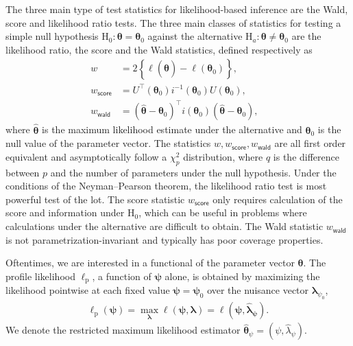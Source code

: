 \documentclass[]{book}
\begin{document}
The three main type of test statistics for likelihood-based inference are the Wald, score and likelihood ratio tests.
The three main classes of statistics for testing a simple null hypothesis \(\mathrm{H}_0: \boldsymbol{\theta}=\boldsymbol{\theta}_0\) against the alternative \(\mathrm{H}_a: \boldsymbol{\theta} \neq \boldsymbol{\theta}_0\) are the likelihood ratio, the score and the Wald statistics,
defined
respectively as
\begin{align*}
 w &= 2 \left\{ \ell(\hat{\boldsymbol{\theta}})-\ell(\boldsymbol{\theta}_0)\right\},\qquad 
 \\w_{\mathsf{score}} &= U^\top(\boldsymbol{\theta}_0)i^{-1}(\boldsymbol{\theta}_0)U(\boldsymbol{\theta}_0),\qquad
 \\ w_{\mathsf{wald}} &= (\hat{\boldsymbol{\theta}}-\boldsymbol{\theta}_0)^\top i(\boldsymbol{\theta}_0)(\hat{\boldsymbol{\theta}}-\boldsymbol{\theta}_0),
\end{align*}
where \(\hat{\boldsymbol{\theta}}\) is the maximum likelihood estimate under the alternative and
\(\boldsymbol{\theta}_0\) is the null value of the parameter vector. The statistics \(w, w_{\mathsf{score}}, w_{\mathsf{wald}}\) are all first order equivalent and asymptotically follow a \(\chi^2_p\) distribution, where \(q\) is the difference between \(p\) and the number of parameters under the null hypothesis. Under the conditions of the Neyman--Pearson theorem, the likelihood ratio test is most powerful test of the lot. The score statistic \(w_{\mathsf{score}}\) only requires
calculation of the score and information under
\(\mathrm{H}_0\), which can be useful in problems where calculations under the alternative are difficult to obtain. The Wald statistic \(w_{\mathsf{wald}}\) is not parametrization-invariant and typically has poor coverage properties.

Oftentimes, we are interested in a functional of the parameter vector \(\boldsymbol{\theta}\).
The profile
likelihood \(\ell_\mathrm{p}\), a function of \(\boldsymbol{\psi}\) alone, is obtained by maximizing the
likelihood pointwise at each fixed value \(\boldsymbol{\psi}=\boldsymbol{\psi}_0\) over the nuisance vector
\(\boldsymbol{\lambda}_{\psi_0}\),
\begin{align*}
   \ell_\mathrm{p}(\boldsymbol{\psi})=\max_{\boldsymbol{\lambda}}\ell(\boldsymbol{\psi}, \boldsymbol{\lambda})=\ell(\boldsymbol{\psi}, \hat{\boldsymbol{\lambda}}_{\boldsymbol{\psi}}).
\end{align*}
We denote the restricted maximum likelihood estimator \(\hat{\boldsymbol{\theta}}_\psi= (\psi, \hat{\lambda}_{\psi})\).
\end{document}
